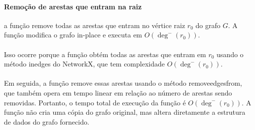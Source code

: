 \documentclass[12pt,a4paper]{article}
\def\texttt#1{#1}%
\def\emph#1{#1}%
\def\_{}%
\begin{document}
\paragraph{Remoção de arestas que entram na raiz}
a função remove todas as arestas que entram no vértice raiz \(r_0\) do grafo \(G\). A função modifica o grafo \emph{in-place} e executa em \(O(\deg^-(r_0))\). 

\paragraph{}
Isso ocorre porque a função obtém todas as arestas que entram em \(r_0\) usando o método \texttt{in\_edges} do NetworkX, que tem complexidade \(O(\deg^-(r_0))\). 

\paragraph{}
Em seguida, a função remove essas arestas usando o método \texttt{remove\_edges\_from}, que também opera em tempo linear em relação ao número de arestas sendo removidas. Portanto, o tempo total de execução da função é \(O(\deg^-(r_0))\). A função não cria uma cópia do grafo original, mas altera diretamente a estrutura de dados do grafo fornecido. 
\end{document}

